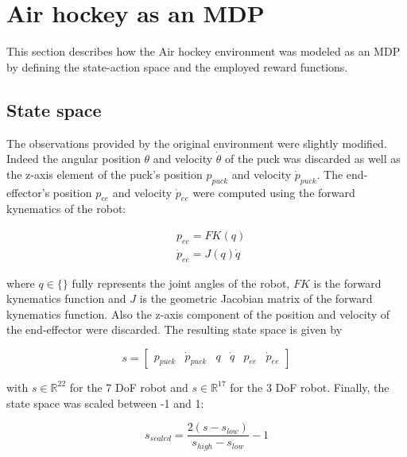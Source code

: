 \section{Air hockey as an MDP}
\label{sec:air_hockey_mdp}

This section describes how the Air hockey environment was modeled as an MDP by defining the state-action space and the employed reward functions.

\subsection{State space}

The observations provided by the original environment were slightly modified. Indeed the angular position $\theta$ and velocity $\dot{\theta}$ of the puck was discarded as well
as the z-axis element of the puck's position ${p}_{puck}$ and velocity ${\dot{p}}_{puck}$. The end-effector's position ${p}_{ee}$ and velocity
${\dot{p}}_{ee}$ were computed using the forward kynematics of the robot:

\begin{equation*}
    \begin{aligned}
        &{p}_{ee} = FK({q}) \\
        &{\dot{p}}_{ee} = {J}({q}){\dot{q}}
    \end{aligned}
\end{equation*}

where $q \in \{\}$ fully represents the joint angles of the robot, $FK$ is the forward kynematics function and ${J}$ is the geometric Jacobian matrix of the forward kynematics function. Also the z-axis component of the position and velocity of the end-effector
were discarded. The resulting state space is given by
        
\begin{equation*}
    {s} = \begin{bmatrix}
            {p}_{puck} & {\dot{p}}_{puck} & {q} & {\dot{q}} & {p}_{ee} & {\dot{p}}_{ee}
        \end{bmatrix}
\end{equation*}


with $s \in \mathbb{R}^{22}$ for the 7 DoF robot and $s \in \mathbb{R}^{17}$ for the 3 DoF robot.
Finally, the state space was scaled between -1 and 1:

\begin{equation*}
    {s}_{scaled} = \frac{2\left(s - s_{low}\right)}{s_{high} - s_{low}} - 1
\end{equation*}

